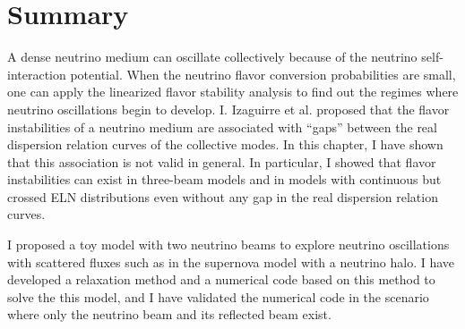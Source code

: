 






\section{\label{chap:collective-sec:conclusion}Summary}

A dense neutrino medium can oscillate collectively because of the neutrino self-interaction potential. When the neutrino flavor conversion probabilities are small, one can apply the linearized flavor stability analysis to find out the regimes where neutrino oscillations begin to develop. I. Izaguirre et al. proposed that the flavor instabilities of a neutrino medium are associated with ``gaps'' between the real dispersion relation curves of the collective modes. In this chapter, I have shown that this association is not valid in general. In particular, I showed that flavor instabilities can exist in three-beam models and in models with continuous but crossed ELN distributions even without any gap in the real dispersion relation curves. 

I proposed a toy model with two neutrino beams to explore neutrino oscillations with scattered fluxes such as in the supernova model with a neutrino halo. I have developed a relaxation method and a numerical code based on this method to solve the this model, and I have validated the numerical code in the scenario where only the neutrino beam and its reflected beam exist.


